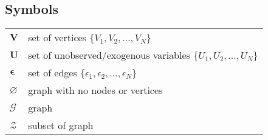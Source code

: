 \documentclass[main=english,12pt,a4paper,pdftex,econ,utf8]{aaltothesis}
\let\emptyset\varnothing
\newcommand{\z}{\mathcal{Z}}
\newcommand{\g}{\mathcal{G}}
\newcommand{\e}{\bm{\epsilon}}
\newcommand{\vars}{\bm{V}}
\newcommand{\unobs}{\bm{U}}
\begin{document}
\begin{comment}
\newpage
%
\thesistitle{Opinnäyteohje}
\advisor{TkT Olli Ohjaaja}
\degreeprogram{Electronics and electrical engineering}
\department{Radiotieteen ja -tekniikan laitos}
\professorship{Piiriteoria}
\keywords{Vastus, Resistanssi,\\ Lämpötila}
\begin{abstractpage}[finnish]
  Tiivistelmässä on lyhyt selvitys (noin 100 sanaa)
  kirjoituksen tärkeimmästä sisällöstä: mitä ja miten on tutkittu,
  sekä mitä tuloksia on saatu. 
  Tiivistelmässä on lyhyt selvitys (noin 100 sanaa)
  kirjoituksen tärkeimmästä sisällöstä: mitä ja miten on tutkittu,
  sekä mitä tuloksia on saatu. 

  Tiivistelmässä on lyhyt selvitys (noin 100 sanaa)
  kirjoituksen tärkeimmästä sisällöstä: mitä ja miten on tutkittu,
  sekä mitä tuloksia on saatu. 
  Tiivistelmässä on lyhyt selvitys (noin 100 sanaa)
  kirjoituksen tärkeimmästä sisällöstä: mitä ja miten on tutkittu,
  sekä mitä tuloksia on saatu. 
  Tiivistelmässä on lyhyt selvitys (noin 100 sanaa)
  kirjoituksen tärkeimmästä sisällöstä: mitä ja miten on tutkittu,
  sekä mitä tuloksia on saatu. 
\end{abstractpage}

\end{comment}
\newpage
%

{
\hypersetup{linkcolor=black}
\thesistableofcontents
}


\subsection*{Symbols}

\begin{tabular}{ll}
$\vars$ & set of vertices $\{V_{1},V_{2},\ldots,V_{N}\}$ \\
$\unobs$ & set of unobserved/exogenous variables $\{U_{1},U_{2},\ldots,U_{N}\}$ \\
$\e$ & set of edges $\{\epsilon_{1},\epsilon_{2},\ldots,\epsilon_{N}\}$ \\
$\emptyset$ & graph with no nodes or vertices \\
$\g$ & graph \\
$\z$ & subset of graph
\end{tabular}
\end{document}
